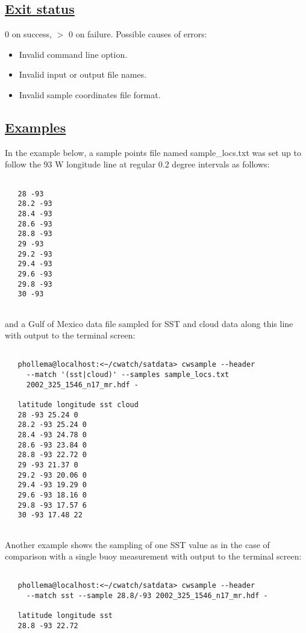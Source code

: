 \subsection*{\underline{Exit status}}


  0 on success, $>$ 0 on failure. Possible causes of errors: \begin{itemize}
\item  Invalid command line option. 
\item  Invalid input or output file names. 
\item  Invalid sample coordinates file format. 

\end{itemize}

\subsection*{\underline{Examples}}


  In the example below, a sample points file named sample\_locs.txt was set up to follow the 93 W longitude line at regular 0.2 degree intervals as follows: \begin{verbatim}

   28 -93
   28.2 -93
   28.4 -93
   28.6 -93
   28.8 -93
   29 -93
   29.2 -93
   29.4 -93
   29.6 -93
   29.8 -93
   30 -93
 
\end{verbatim}
 and a Gulf of Mexico data file sampled for SST and cloud data along this line with output to the terminal screen: \begin{verbatim}

   phollema@localhost:<~/cwatch/satdata> cwsample --header 
     --match '(sst|cloud)' --samples sample_locs.txt 
     2002_325_1546_n17_mr.hdf -

   latitude longitude sst cloud
   28 -93 25.24 0
   28.2 -93 25.24 0
   28.4 -93 24.78 0
   28.6 -93 23.84 0
   28.8 -93 22.72 0
   29 -93 21.37 0
   29.2 -93 20.06 0
   29.4 -93 19.29 0
   29.6 -93 18.16 0
   29.8 -93 17.57 6
   30 -93 17.48 22
 
\end{verbatim}
 Another example shows the sampling of one SST value as in the case of comparison with a single buoy measurement with output to the terminal screen: \begin{verbatim}

   phollema@localhost:<~/cwatch/satdata> cwsample --header 
     --match sst --sample 28.8/-93 2002_325_1546_n17_mr.hdf -

   latitude longitude sst
   28.8 -93 22.72
 
\end{verbatim}


